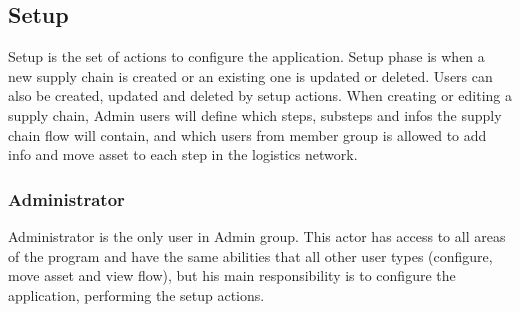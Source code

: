 \subsection{Setup}\label{sec:Setup}

Setup is the set of actions to configure the application. Setup phase is when a new supply chain is created or an existing one is updated or deleted. Users can also be created, updated and deleted by setup actions. When creating or editing a supply chain, Admin users will define which steps, substeps and infos the supply chain flow will contain, and which users from member group is allowed to add info and move asset to each step in the logistics network.

\subsubsection{Administrator}\label{sec:Administrator}
Administrator is the only user in Admin group. This actor has access to all areas of the program and have the same abilities that all other user types (configure, move asset and view flow), but his main responsibility is to configure the application, performing the setup actions. 